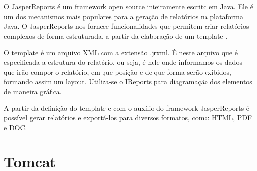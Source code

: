O JasperReports é um framework open source inteiramente escrito em Java. Ele é um dos mecanismos mais populares para a geração de relatórios na plataforma Java.
O JasperReports nos fornece funcionalidades que permitem criar relatórios complexos de forma estruturada, a partir da elaboração de um template \cite{Devmedia2012}.

O template é um arquivo XML com a extensão .jrxml. É neste arquivo que é especificada a estrutura do relatório, ou seja, é nele onde informamos os dados que irão compor o relatório, em que posição e de que forma serão exibidos, formando assim um layout. Utiliza-se o IReports para diagramação dos elementos de maneira gráfica.

A partir da definição do template e com o auxílio do framework JasperReports é possível gerar relatórios e exportá-los para diversos formatos, como: HTML, PDF e DOC.

\section{Tomcat}
\label{sec:embasamentoTeoricoTomcat}


